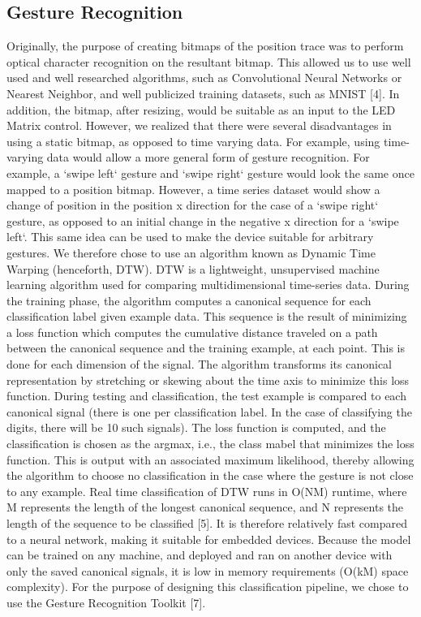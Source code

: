 \documentclass{sig-alternate-05-2015}
\begin{document}
\subsection{Gesture Recognition}
Originally, the purpose of creating bitmaps of the position trace was to perform optical character recognition on the resultant bitmap. This allowed us to use well used and well researched algorithms, such as Convolutional Neural Networks or Nearest Neighbor, and well publicized training datasets, such as MNIST  [4]. In addition, the bitmap, after resizing, would be suitable as an input to the LED Matrix control. However, we realized that there were several disadvantages in using a static bitmap, as opposed to time varying data. For example, using time-varying data would allow a more general form of gesture recognition. For example, a `swipe left` gesture and `swipe right` gesture would look the same once mapped to a position bitmap. However, a time series dataset would show a change of position in the position x direction for the case of a `swipe right` gesture, as opposed to an initial change in the negative x direction for a `swipe left`. This same idea can be used to make the device suitable for arbitrary gestures. We therefore chose to use an algorithm known as Dynamic Time Warping (henceforth, DTW). DTW is a lightweight, unsupervised machine learning algorithm used for comparing multidimensional time-series data. During the training phase, the algorithm computes a canonical sequence for each classification label given example data. This sequence is the result of minimizing a loss function which computes the cumulative distance traveled on a path between the canonical sequence and the training example, at each point. This is done for each dimension of the signal. The algorithm transforms its canonical representation by stretching or skewing about the time axis to minimize this loss function. During testing and classification, the test example is compared to each canonical signal (there is one per classification label. In the case of classifying the digits, there will be 10 such signals). The loss function is computed, and the classification is chosen as the argmax, i.e., the class mabel that minimizes the loss function. This is output with an associated maximum likelihood, thereby allowing the algorithm to choose no classification in the case where the gesture is not close to any example. Real time classification of DTW runs in O(NM) runtime, where M represents the length of the longest canonical sequence, and N represents the length of the sequence to be classified [5]. It is therefore relatively fast compared to a neural network, making it suitable for embedded devices. Because the model can be trained on any machine, and deployed and ran on another device with only the saved canonical signals, it is low in memory requirements (O(kM) space complexity).  For the purpose of designing this classification pipeline, we chose to use the Gesture Recognition Toolkit  [7].
\end{document}
